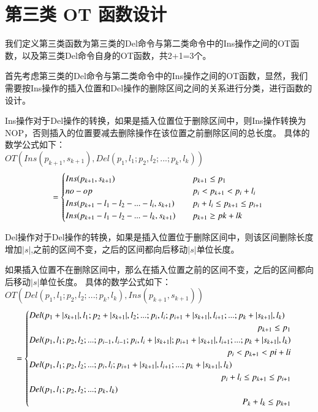 \section{第三类 OT 函数设计}
\par 我们定义第三类函数为第三类的Del命令与第二类命令中的Ins操作之间的OT函数，以及第三类Del命令自身的OT函数，共2+1=3个。

\par 首先考虑第三类的Del命令与第二类命令中的Ins操作之间的OT函数，显然，我们需要按Ins操作的插入位置和Del操作的删除区间之间的关系进行分类，进行函数的设计。
\par Ins操作对于Del操作的转换，如果是插入位置位于删除区间中，则Ins操作转换为NOP，否则插入的位置要减去删除操作在该位置之前删除区间的总长度。
具体的数学公式如下：\\
$OT(Ins(p_{k+1},s_{k+1}),Del(p_1,l_1;p_2,l_2;...;p_k,l_k))$\\
\begin{equation}
= \begin{cases}
Ins(p_{k+1},s_{k+1}) \quad & p_{k+1} \le p_1 \\
no-op \quad & p_i<p_{k+1}<p_i+l_i\\
Ins(p_{k+1}-l_1-l_2-...-l_i,s_{k+1}) \quad & p_i+l_i \le p_{k+1} \le p_{i+1}\\
Ins(p_{k+1}-l_1-l_2-...-l_k,s_{k+1}) \quad & p_{k+1} \ge pk+lk \end{cases}\\
\end{equation}

\par Del操作对于Del操作的转换，如果是插入位置位于删除区间中，则该区间删除长度增加$|s|$,之前的区间不变，之后的区间都向后移动$|s|$单位长度。
\par 如果插入位置不在删除区间中，那么在插入位置之前的区间不变，之后的区间都向后移动$|s|$单位长度。
具体的数学公式如下：\\
$OT(Del(p_1,l_1;p_2,l_2;...;p_k,l_k),Ins(p_{k+1},s_{k+1}))$\\
\begin{equation}
= \begin{cases}
Del(p_1+|s_{k+1}|,l_1;p_2+|s_{k+1}|,l_2;...;p_i,l_i;p_{i+1}+|s_{k+1}|,l_{i+1};...;p_k+|s_{k+1}|,l_k)\\
  \quad \hfill p_{k+1} \le p_1 \\
Del(p_1,l_1;p_2,l_2;...;p_{i-1},l_{i-1};p_i,l_i+|s_{k+1}|;p_{i+1}+|s_{k+1}|,l_{i+1};...;p_k+|s_{k+1}|,l_k)\\
 \quad \hfill p_i<p_{k+1} < pi+li \\
Del(p_1,l_1;p_2,l_2;...;p_i,l_i;p_{i+1}+|s_{k+1}|,l_{i+1};...;p_k+|s_{k+1}|,l_k)\\
  \quad \hfill p_i+l_i \le p_{k+1} \le p_{i+1}\\
Del(p_1,l_1;p_2,l_2;...;p_k,l_k) \\
 \quad \hfill P_k+l_k \le p_{k+1} \\
 \end{cases}\\
\end{equation}

